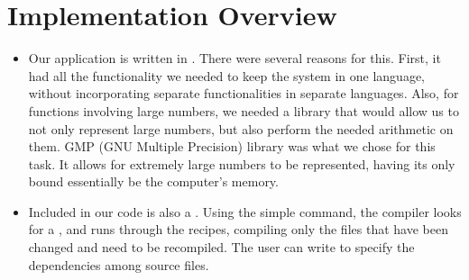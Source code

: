 \section{Implementation Overview}




\begin{itemize}
\item Our application is written in . There were
  several reasons for this. First, it had all the
  functionality we needed to keep the system in one
  language, without incorporating separate functionalities
  in separate languages. Also, for functions involving large
  numbers, we needed a library that would allow us to not
  only represent large numbers, but also perform the needed
  arithmetic on them. GMP (GNU Multiple Precision) library
  was what we chose for this task. It allows for extremely
  large numbers to be represented, having its only bound
  essentially be the computer's memory.
\item Included in our code is also a .
  Using the simple  command, the compiler looks
  for a , and runs through the recipes,
  compiling only the files that have been changed and need
  to be recompiled. The user can write  to
  specify the dependencies among source files.
\end{itemize}
